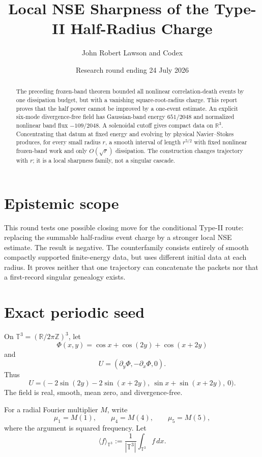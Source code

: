 \documentclass[11pt]{article}
\title{Local NSE Sharpness of the Type-II Half-Radius Charge}
\author{John Robert Lawson and Codex}
\date{Research round ending 24 July 2026}
\theoremstyle{remark}
\newcommand{\R}{\mathbb R}
\newcommand{\T}{\mathbb T}
\begin{document}
\maketitle

\begin{abstract}
The preceding frozen-band theorem bounded all nonlinear correlation-death
events by one dissipation budget, but with a vanishing square-root-radius
charge.  This report proves that the half power cannot be improved by a
one-event estimate.  An explicit six-mode divergence-free field has
Gaussian-band energy \(651/2048\) and normalized nonlinear band flux
\(-109/2048\).  A solenoidal cutoff gives compact data on \(\R^3\).
Concentrating that datum at fixed energy and evolving by physical
Navier--Stokes produces, for every small radius \(r\), a smooth interval of
length \(r^{5/2}\) with fixed nonlinear frozen-band work and only
\(O(\sqrt r)\) dissipation.  The construction changes trajectory with
\(r\); it is a local sharpness family, not a singular cascade.
\end{abstract}

\section{Epistemic scope}

This round tests one possible closing move for the conditional Type-II
route: replacing the summable half-radius event charge by a stronger local
NSE estimate.  The result is negative.  The counterfamily consists entirely
of smooth compactly supported finite-energy data, but uses different initial
data at each radius.  It proves neither that one trajectory can concatenate
the packets nor that a first-record singular genealogy exists.

\section{Exact periodic seed}

On \(\T^3=(\R/2\pi\mathbb Z)^3\), let
\[
 \Phi(x,y)
 =
 \cos x+\cos(2y)+\cos(x+2y)
\]
and
\[
 U
 =
 (\partial_y\Phi,-\partial_x\Phi,0).
\]
Thus
\[
 U
 =
 \bigl(
 -2\sin(2y)-2\sin(x+2y),
 \ \sin x+\sin(x+2y),
 \ 0
 \bigr).
\]
The field is real, smooth, mean zero, and divergence-free.

For a radial Fourier multiplier \(M\), write
\[
 \mu_1=M(1),\qquad \mu_4=M(4),\qquad \mu_5=M(5),
\]
where the argument is squared frequency.  Let
\[
 \langle f\rangle_{\T^3}
 :=
 \frac1{|\T^3|}\int_{\T^3}f\,dx.
\]
\end{document}
